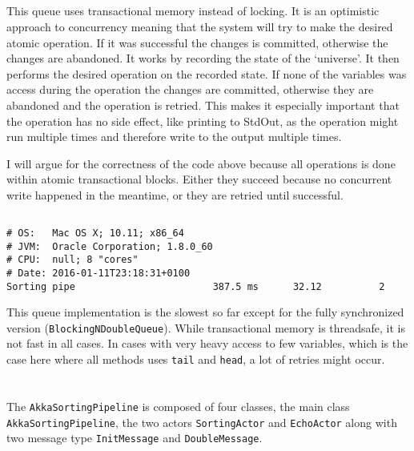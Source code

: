 \documentclass{ituhandin}
\begin{document}
\section{}
This queue uses transactional memory instead of locking. It is an optimistic approach to concurrency meaning that the system will try to make the desired atomic operation. If it was successful the changes is committed, otherwise the changes are abandoned. It works by recording the state of the `universe'. It then performs the desired operation on the recorded state. If none of the variables was access during the operation the changes are committed, otherwise they are abandoned and the operation is retried. This makes it especially important that the operation has no side effect, like printing to StdOut, as the operation might run multiple times and therefore write to the output multiple times.

I will argue for the correctness of the code above because all operations is done within atomic transactional blocks. Either they succeed because no concurrent write happened in the meantime, or they are retried until successful.

\section{}
\begin{lstlisting}[language={},frame={}]
# OS:   Mac OS X; 10.11; x86_64
# JVM:  Oracle Corporation; 1.8.0_60
# CPU:  null; 8 "cores"
# Date: 2016-01-11T23:18:31+0100
Sorting pipe                        387.5 ms      32.12          2
\end{lstlisting}

This queue implementation is the slowest so far except for the fully synchronized version (\texttt{BlockingNDoubleQueue}). While transactional memory is threadsafe, it is not fast in all cases. In cases with very heavy access to few variables, which is the case here where all methods uses \texttt{tail} and \texttt{head}, a lot of retries might occur.

\chapter{} %
\section{}

The \texttt{AkkaSortingPipeline} is composed of four classes, the main class \texttt{AkkaSortingPipeline}, the two actors \texttt{SortingActor} and \texttt{EchoActor} along with two message type \texttt{InitMessage} and \texttt{DoubleMessage}. 
\end{document}

